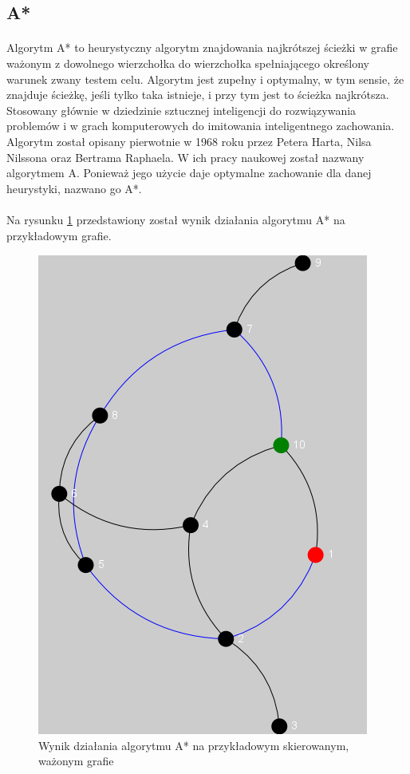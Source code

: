 \subsection{A*}
\paragraph{}
Algorytm A* to heurystyczny algorytm znajdowania najkrótszej ścieżki w grafie ważonym z dowolnego wierzchołka do wierzchołka spełniającego określony
warunek zwany testem celu. 
Algorytm jest zupełny i optymalny, w tym sensie, że znajduje ścieżkę, jeśli tylko taka istnieje, i przy tym jest to ścieżka najkrótsza. 
Stosowany głównie w dziedzinie sztucznej inteligencji do rozwiązywania problemów i w grach komputerowych do imitowania inteligentnego zachowania.
Algorytm został opisany pierwotnie w 1968 roku przez Petera Harta, Nilsa Nilssona oraz Bertrama Raphaela. 
W ich pracy naukowej został nazwany algorytmem A. 
Ponieważ jego użycie daje optymalne zachowanie dla danej heurystyki, nazwano go A*.

\paragraph{}
Na rysunku \ref{fig:aStar} przedstawiony został wynik działania algorytmu A* na przykładowym grafie.

\begin{figure}[!h]
 \centering
 \includegraphics{algorithms/dfs}
 \caption{Wynik działania algorytmu A* na przykładowym skierowanym, ważonym grafie}
 \label{fig:aStar}
\end{figure}

